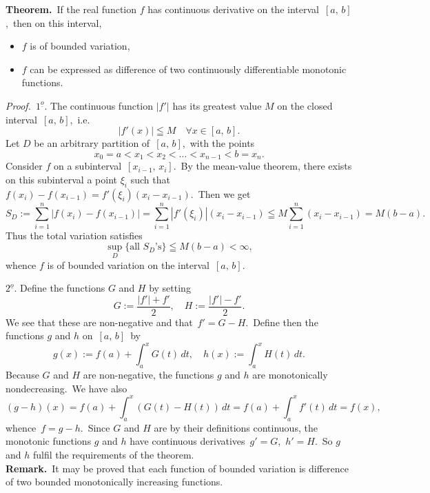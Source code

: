 \documentclass[12pt]{article}
\theoremstyle{definition}
\begin{document}
\textbf{Theorem.}\, If the real function $f$ has continuous derivative on the interval \,$[a,\,b]$,\, then on this interval,
\begin{itemize}
\item $f$ is of bounded variation,
\item $f$ can be expressed as difference of two continuously differentiable monotonic functions.
\end{itemize}

{\em Proof.}\, $1^{\underline{o}}$. The continuous function $|f'|$ has its greatest value $M$ on the closed interval \,$[a,\,b]$,\, i.e.
$$|f'(x)| \leqq M \quad \forall x \in [a,\,b].$$
Let $D$ be an arbitrary partition of\, $[a,\,b]$,\, with the points 
$$x_0 = a < x_1 < x_2 < \ldots < x_{n-1} < b = x_n.$$
Consider $f$ on a subinterval \,$[x_{i-1},\,x_i]$.\, By the mean-value theorem, there exists on this subinterval a point $\xi_i$ such that\, $f(x_i)-f(x_{i-1}) = f'(\xi_i)(x_i-x_{i-1})$.\, Then we get
$$S_D := \sum_{i=1}^n|f(x_i)-f(x_{i-1})| = \sum_{i=1}^n|f'(\xi_i)|(x_i-x_{i-1}) \leqq M\sum_{i=1}^n(x_i-x_{i-1}) 
= M(b-a).$$
Thus the total variation satisfies
$$\sup_{D}\{\mbox{all }S_D\mbox{'s}\} \leqq M(b-a) < \infty,$$
whence $f$ is of bounded variation on the interval\, $[a,\,b]$.

$2^{\underline{o}}$. Define the functions $G$ and $H$ by setting
$$G := \frac{|f'|+f'}{2}, \quad H := \frac{|f'|-f'}{2}.$$
We see that these are non-negative and that\, $f' = G-H$.\, Define then the functions $g$ and $h$ on\, $[a,\,b]$\, by
$$g(x) := f(a)+\int_a^xG(t)\,dt, \quad h(x) := \int_a^xH(t)\,dt.$$
Because $G$ and $H$ are non-negative, the functions $g$ and $h$ are monotonically nondecreasing.\, We have also
$$(g-h)(x) = f(a)\!+\!\int_a^x(G(t)\!-\!H(t))\,dt = f(a)\!+\!\int_a^xf'(t)\,dt = f(x),$$
whence\, $f = g-h$.\, Since $G$ and $H$ are by their definitions continuous, the monotonic functions $g$ and $h$ have continuous derivatives \,$g' = G$,\, $h' = H$.\, So $g$ and $h$ fulfil the requirements of the theorem.\\

\textbf{Remark.}\, It may be proved that each function of bounded variation is difference of two bounded monotonically increasing functions. 

\end{document}

